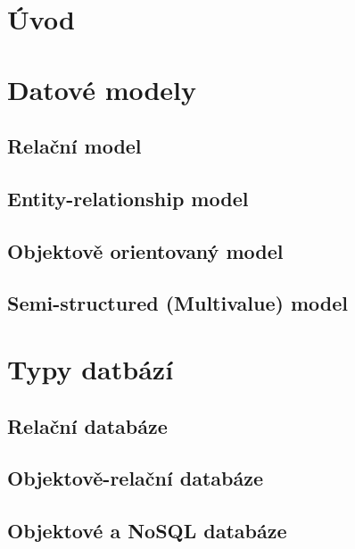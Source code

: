
\section{Úvod}
\cite[s.~1--52]{korth:dbsc}
\section{Datové modely}
\subsection{Relační model}
\subsection{Entity-relationship model}
\subsection{Objektově orientovaný model}
\subsection{Semi-structured (Multivalue) model}
\section{Typy datbází}
\subsection{Relační databáze}
\subsection{Objektově-relační databáze}
\subsection{Objektové a NoSQL databáze}
\cite[s.~945--975]{korth:dbsc}

